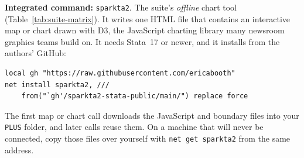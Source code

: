 \begin{kaobox}[frametitle=Package Integration: \texttt{sparkta2}]
\textbf{Integrated command:} \texttt{sparkta2}. The suite's \emph{offline} chart tool (Table~\ref{tab:suite-matrix}). It writes one HTML file that contains an interactive map or chart drawn with D3, the JavaScript charting library many newsroom graphics teams build on. It needs Stata~17 or newer, and it installs from the authors' GitHub:
\par
{\footnotesize
\begin{verbatim}
local gh "https://raw.githubusercontent.com/ericabooth"
net install sparkta2, ///
    from("`gh'/sparkta2-stata-public/main/") replace force
\end{verbatim}
}
The first map or chart call downloads the JavaScript and boundary files into your \texttt{PLUS} folder, and later calls reuse them. On a machine that will never be connected, copy those files over yourself with \texttt{net get sparkta2} from the same address.
\end{kaobox}


